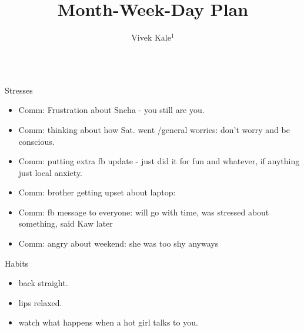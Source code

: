 \documentclass[serif,mathserif,final]{beamer}
\title{Month-Week-Day Plan}
\author{Vivek Kale$^1$}
\institute{$^1$ University of Illinois at Urbana-Champaign \quad}
\begin{document}
 
\begin{frame}{} 

  \begin{columns}[t]
\begin{column}{0.25\linewidth} %
  \begin{block}{ Stresses} 
    \begin{itemize}
    \tiny \item \tiny Comm: Frustration about Sneha - you still are you.
    \item \tiny Comm: thinking about how Sat. went /general worries:
      don't worry and be conscious. 
    \item \tiny Comm: putting extra fb update - just did it for fun
      and whatever, if anything just local anxiety. 
    \item \tiny Comm: brother getting upset about laptop: 
    \item \tiny Comm: fb message to everyone: will go with time, was stressed about something, said Kaw later
    \item \tiny Comm: angry about weekend: she was too shy anyways
    \end{itemize} 
  \end{block} 
  
  \begin{block}{ Habits } 
    \begin{itemize} 
    \tiny \item \tiny back straight. 
    \item \tiny lips relaxed. 
    \item \tiny watch what happens when a hot girl talks to you. 
    \end{itemize} 
  \end{block} 


\end{column}
\end{columns}
\end{frame}
\end{document}
